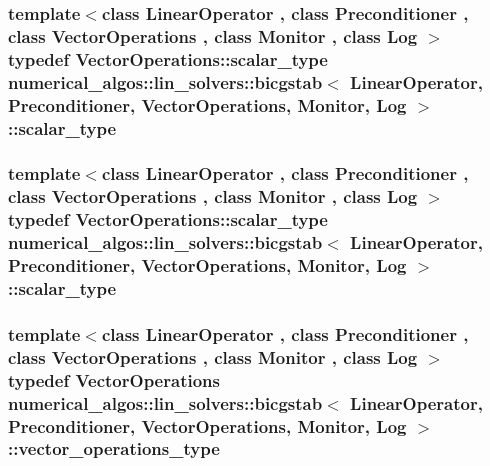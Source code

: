 \hypertarget{classnumerical__algos_1_1lin__solvers_1_1bicgstab_a051c0387d2b7f9c86883a0e612291876}{
\subsubsection[{scalar\-\_\-type}]{\setlength{\rightskip}{0pt plus 5cm}template$<$class Linear\-Operator , class Preconditioner , class Vector\-Operations , class Monitor , class Log $>$ typedef Vector\-Operations\-::scalar\-\_\-type {\bf numerical\-\_\-algos\-::lin\-\_\-solvers\-::bicgstab}$<$ Linear\-Operator, Preconditioner, Vector\-Operations, Monitor, Log $>$\-::{\bf scalar\-\_\-type}}}\label{classnumerical__algos_1_1lin__solvers_1_1bicgstab_a051c0387d2b7f9c86883a0e612291876}
\hypertarget{classnumerical__algos_1_1lin__solvers_1_1bicgstab_a051c0387d2b7f9c86883a0e612291876}{
\subsubsection[{scalar\-\_\-type}]{\setlength{\rightskip}{0pt plus 5cm}template$<$class Linear\-Operator , class Preconditioner , class Vector\-Operations , class Monitor , class Log $>$ typedef Vector\-Operations\-::scalar\-\_\-type {\bf numerical\-\_\-algos\-::lin\-\_\-solvers\-::bicgstab}$<$ Linear\-Operator, Preconditioner, Vector\-Operations, Monitor, Log $>$\-::{\bf scalar\-\_\-type}}}\label{classnumerical__algos_1_1lin__solvers_1_1bicgstab_a051c0387d2b7f9c86883a0e612291876}
\hypertarget{classnumerical__algos_1_1lin__solvers_1_1bicgstab_a6ff5c085063b744de8b72fd42bd45f33}{
\subsubsection[{vector\-\_\-operations\-\_\-type}]{\setlength{\rightskip}{0pt plus 5cm}template$<$class Linear\-Operator , class Preconditioner , class Vector\-Operations , class Monitor , class Log $>$ typedef Vector\-Operations {\bf numerical\-\_\-algos\-::lin\-\_\-solvers\-::bicgstab}$<$ Linear\-Operator, Preconditioner, Vector\-Operations, Monitor, Log $>$\-::{\bf vector\-\_\-operations\-\_\-type}}}\label{classnumerical__algos_1_1lin__solvers_1_1bicgstab_a6ff5c085063b744de8b72fd42bd45f33}
